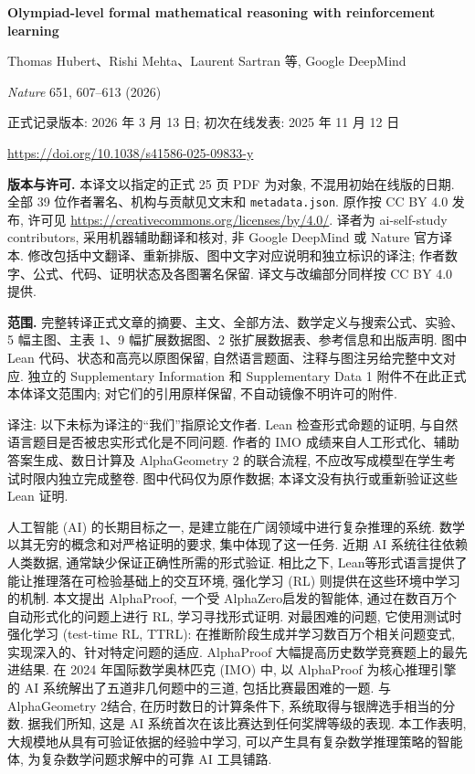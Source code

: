 \label{alphaproof-paper}
\begin{center}
\textbf{Olympiad-level formal mathematical reasoning with reinforcement learning}\par
Thomas Hubert、Rishi Mehta、Laurent Sartran 等, Google DeepMind\par
\textit{Nature} 651, 607--613 (2026)\par
正式记录版本: 2026 年 3 月 13 日; 初次在线发表: 2025 年 11 月 12 日\par
\url{https://doi.org/10.1038/s41586-025-09833-y}
\end{center}
\noindent\textbf{版本与许可.} 本译文以指定的正式 25 页 PDF 为对象, 不混用初始在线版的日期. 全部 39 位作者署名、机构与贡献见文末和 \texttt{metadata.json}. 原作按 CC BY 4.0 发布, 许可见 \url{https://creativecommons.org/licenses/by/4.0/}. 译者为 ai-self-study contributors, 采用机器辅助翻译和核对, 非 Google DeepMind 或 Nature 官方译本. 修改包括中文翻译、重新排版、图中文字对应说明和独立标识的译注; 作者数字、公式、代码、证明状态及各图署名保留. 译文与改编部分同样按 CC BY 4.0 提供.

\noindent\textbf{范围.} 完整转译正式文章的摘要、主文、全部方法、数学定义与搜索公式、实验、5 幅主图、主表 1、9 幅扩展数据图、2 张扩展数据表、参考信息和出版声明. 图中 Lean 代码、状态和高亮以原图保留, 自然语言题面、注释与图注另给完整中文对应. 独立的 Supplementary Information 和 Supplementary Data 1 附件不在此正式本体译文范围内; 对它们的引用原样保留, 不自动镜像不明许可的附件.

\begin{remark}
译注: 以下未标为译注的“我们”指原论文作者. Lean 检查形式命题的证明, 与自然语言题目是否被忠实形式化是不同问题. 作者的 IMO 成绩来自人工形式化、辅助答案生成、数日计算及 AlphaGeometry 2 的联合流程, 不应改写成模型在学生考试时限内独立完成整卷. 图中代码仅为原作数据; 本译文没有执行或重新验证这些 Lean 证明.
\end{remark}

\label{alphaproof-abstract}
人工智能 (AI) 的长期目标之一, 是建立能在广阔领域中进行复杂推理的系统. 数学以其无穷的概念和对严格证明的要求, 集中体现了这一任务. 近期 AI 系统往往依赖人类数据, 通常缺少保证正确性所需的形式验证. 相比之下, Lean\cite{alphaproof-ref1}等形式语言提供了能让推理落在可检验基础上的交互环境, 强化学习 (RL) 则提供在这些环境中学习的机制. 本文提出 AlphaProof, 一个受 AlphaZero\cite{alphaproof-ref2}启发的智能体, 通过在数百万个自动形式化的问题上进行 RL, 学习寻找形式证明. 对最困难的问题, 它使用测试时强化学习 (test-time RL, TTRL): 在推断阶段生成并学习数百万个相关问题变式, 实现深入的、针对特定问题的适应. AlphaProof 大幅提高历史数学竞赛题上的最先进结果. 在 2024 年国际数学奥林匹克 (IMO) 中, 以 AlphaProof 为核心推理引擎的 AI 系统解出了五道非几何题中的三道, 包括比赛最困难的一题. 与 AlphaGeometry 2\cite{alphaproof-ref3}结合, 在历时数日的计算条件下, 系统取得与银牌选手相当的分数. 据我们所知, 这是 AI 系统首次在该比赛达到任何奖牌等级的表现. 本工作表明, 大规模地从具有可验证依据的经验中学习, 可以产生具有复杂数学推理策略的智能体, 为复杂数学问题求解中的可靠 AI 工具铺路.

